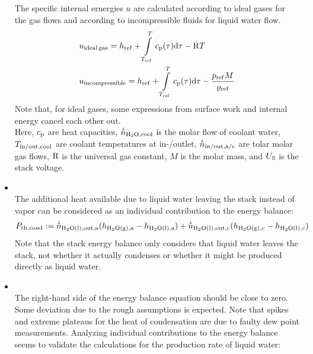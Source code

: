 \begin{itemize}
       The specific internal ernergies $u$ are calculated according to ideal gases for the gas flows and according to incompressible fluids for liquid water flow.
       \begin{align}
        &u_{\mathrm{ideal\,gas}} = h_{\mathrm{ref}}+\int\limits_{T_{\mathrm{ref}}}^T c_{\mathrm{p}}(\tau)\mathrm{d}\tau - \mathrm{R} T\\
        &u_{\mathrm{incompressible}} = h_{\mathrm{ref}}+\int\limits_{T_{\mathrm{ref}}}^T c_{\mathrm{p}}(\tau)\mathrm{d}\tau-\frac{p_{\mathrm{ref}} M}{\varrho_{\mathrm{ref}}}
       \end{align}
       Note that, for ideal gases, some expressions from surface work and internal energy cancel each other out.\\
       Here, $c_{\mathrm{p}}$ are heat capacities, $\dot{\tilde n}_{\mathrm{H_2O,cool}}$ is the molar flow of coolant water, $T_{\mathrm{in/out,cool}}$ are coolant temperatures at in-/outlet, $\dot{\tilde n}_{\mathrm{in/out,a/c}}$ are tolar molar gas flows, $\mathrm{R}$ is the universal gas constant, $M$ is the molar mass, and $U_{\mathrm{S}}$ is the stack voltage.
   \item {}\\
       The additional heat available due to liquid water leaving the stack instead of vapor can be considered as an individual contribution to the energy balance:
       \begin{align}
        P_{\mathrm{th,cond}} := \dot{\tilde n}_{\mathrm{H_2O(l),out,a}}(h_{\mathrm{H_2O(g),a}}-h_{\mathrm{H_2O(l),a}}) + \dot{\tilde n}_{\mathrm{H_2O(l),out,c}} (h_{\mathrm{H_2O(g),c}}-h_{\mathrm{H_2O(l),c}})
       \end{align}
       Note that the stack energy balance only considers that liquid water leaves the stack, not whether it actually condenses or whether it might be produced directly as liquid water.
   \item {}\\
       The right-hand side of the energy balance equation should be close to zero.
       Some deviation due to the rough assumptions is expected.
       Note that spikes and extreme plateaus for the heat of condensation are due to faulty dew point measurements.
       Analyzing individual contributions to the energy balance seems to validate the calculations for the production rate of liquid water:\\
       \begin{center}

\end{center}
\end{itemize}
